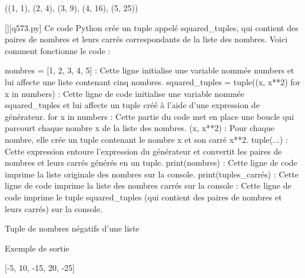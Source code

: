 ((1, 1), (2, 4), (3, 9), (4, 16), (5, 25))
        \par
        \begin{solution}
            \renewcommand{\nomfichier}{q573.py}
            \pythonfile{\chemincode \nomfichier}[][\nomfichier]
            Ce code Python crée un tuple appelé squared\_tuples, qui contient des paires de nombres et leurs carrés correspondants de la liste des nombres. Voici comment fonctionne le code :

    nombres = [1, 2, 3, 4, 5] : Cette ligne initialise une variable nommée numbers et lui affecte une liste contenant cinq nombres.
    squared\_tuples = tuple((x, x**2) for x in numbers) : Cette ligne de code initialise une variable nommée squared\_tuples et lui affecte un tuple créé à l'aide d'une expression de générateur.
        for x in numbers : Cette partie du code met en place une boucle qui parcourt chaque nombre x de la liste des nombres.
        (x, x**2) : Pour chaque nombre, elle crée un tuple contenant le nombre x et son carré x**2.
        tuple(...) : Cette expression entoure l'expression du générateur et convertit les paires de nombres et leurs carrés générés en un tuple.
    print(nombres) : Cette ligne de code imprime la liste originale des nombres sur la console.
    print(tuples\_carrés) : Cette ligne de code imprime la liste des nombres carrés sur la console : Cette ligne de code imprime le tuple squared\_tuples (qui contient des paires de nombres et leurs carrés) sur la console.
        \end{solution}
        

        \question
        Tuple de nombres négatifs d'une liste

Exemple de sortie

[-5, 10, -15, 20, -25]

